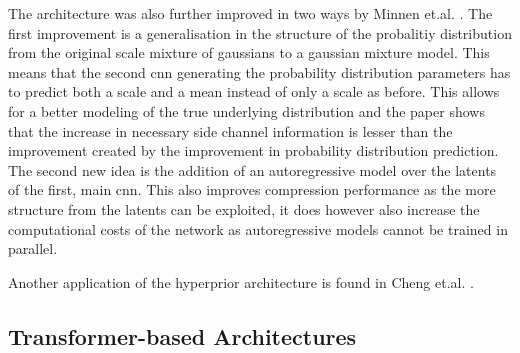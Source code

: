 The architecture was also further improved in two ways by Minnen et.al. \citep{minnen_joint_2018}. The first improvement is a generalisation in the structure of the probalitiy distribution from the original scale mixture of gaussians \citep{wainwright_scale_1999} to a gaussian mixture model. This means that the second \ac{cnn} generating the probability distribution parameters has to predict both a scale and a mean instead of only a scale as before. This allows for a better modeling of the true underlying distribution and the paper shows that the increase in necessary side channel information is lesser than the improvement created by the improvement in probability distribution prediction.
The second new idea is the addition of an autoregressive model over the latents of the first, main \ac{cnn}. This also improves compression performance as the more structure from the latents can be exploited, it does however also increase the computational costs of the network as autoregressive models cannot be trained in parallel. 

Another application of the hyperprior architecture is found in Cheng et.al. \citep{cheng_learned_2020}.

\subsection{Transformer-based Architectures}